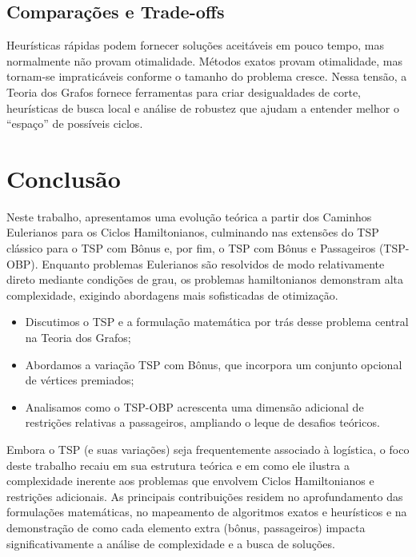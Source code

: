\documentclass[12pt, a4paper]{report}
\begin{document}
\section{Comparações e Trade-offs}
Heurísticas rápidas podem fornecer soluções aceitáveis em pouco tempo, mas normalmente não provam otimalidade. Métodos exatos provam otimalidade, mas tornam-se impraticáveis conforme o tamanho do problema cresce. Nessa tensão, a Teoria dos Grafos fornece ferramentas para criar desigualdades de corte, heurísticas de busca local e análise de robustez que ajudam a entender melhor o “espaço” de possíveis ciclos.

\chapter{Conclusão}
Neste trabalho, apresentamos uma evolução teórica a partir dos Caminhos Eulerianos para os Ciclos Hamiltonianos, culminando nas extensões do TSP clássico para o TSP com Bônus e, por fim, o TSP com Bônus e Passageiros (TSP-OBP). Enquanto problemas Eulerianos são resolvidos de modo relativamente direto mediante condições de grau, os problemas hamiltonianos demonstram alta complexidade, exigindo abordagens mais sofisticadas de otimização.

\begin{itemize}
    \item Discutimos o TSP e a formulação matemática por trás desse problema central na Teoria dos Grafos;
    \item Abordamos a variação TSP com Bônus, que incorpora um conjunto opcional de vértices premiados;
    \item Analisamos como o TSP-OBP acrescenta uma dimensão adicional de restrições relativas a passageiros, ampliando o leque de desafios teóricos.
\end{itemize}

Embora o TSP (e suas variações) seja frequentemente associado à logística, o foco deste trabalho recaiu em sua estrutura teórica e em como ele ilustra a complexidade inerente aos problemas que envolvem Ciclos Hamiltonianos e restrições adicionais. As principais contribuições residem no aprofundamento das formulações matemáticas, no mapeamento de algoritmos exatos e heurísticos e na demonstração de como cada elemento extra (bônus, passageiros) impacta significativamente a análise de complexidade e a busca de soluções.
\end{document}
